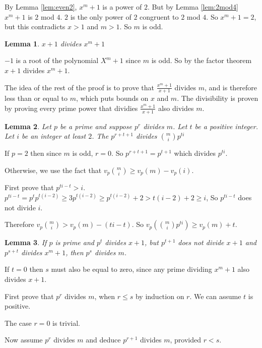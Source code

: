 \documentclass[11pt]{article} %
\newtheorem{lemma}{Lemma}
\begin{document}
By Lemma \ref{lem:even2}, $x^m + 1$ is a power of $2$. But by
Lemma \ref{lem:2mod4} $x^m + 1$ is $2$ mod $4$. $2$ is the only power of $2$ congruent to
$2$ mod $4$. So $x^m + 1 = 2$, but this contradicts $x > 1$ and $m > 1$. So $m$ is odd.

\begin{lemma}\label{lem:poly}
$x + 1$ divides $x^m + 1$
\end{lemma}
$-1$ is a root of the polynomial $X^m + 1$ since $m$ is odd. So by the factor theorem $x+1$ divides
$x^m + 1$.

The idea of the rest of the proof is to prove that $\frac{x^m+1}{x+1}$ divides $m$, and is therefore less
than or equal to $m$, which puts bounds on $x$ and $m$. The divisibility is proven by proving every prime power that
dividies $\frac{x^m+1}{x+1}$ also divides $m$.

\begin{lemma}\label{lem:dvdchoose}
  Let $p$ be a prime and suppose $p^r$ divides $m$. Let $t$ be a positive integer.
  Let $i$ be an integer at least $2$. The $p^{r + t + 1}$ divides ${{m}\choose{i}} p^{ti}$
\end{lemma}

If $p=2$ then since $m$ is odd, $r = 0$. So $p^{r + t +1} = p^{t+1}$ which divides $p^{ti}$.

Otherwise, we use the fact that $v_p{{m}\choose {i}} \ge v_p(m) - v_p(i)$.

First prove that $p^{ti - t} > i$.
$p^{ti - t} = p ^{t} p^{t(i-2)} \ge 3p^{t(i-2)} \ge p^{t(i-2)} + 2 > t(i-2) + 2 \ge i$,
So $p^{ti - t}$ does not divide $i$.

Therefore $v_p{{m}\choose {i}} > v_p(m) - (ti - t) $.
So $v_p\left({{m}\choose {i}}p^{ti}\right) \ge v_p(m) + t$.

\begin{lemma}\label{lem:primepowdvd}
  If $p$ is prime and $p^t$ divides $x+1$, but $p^{t+1}$ does not divide $x+1$ and
  $p^{s+t}$ divides $x^m + 1$, then $p^{s}$ divides $m$.
\end{lemma}

If $t=0$ then $s$ must also be equal to zero, since any prime dividing $x^m+1$ also divides $x+1$.

First prove that $p^r$ divides $m$, when $r \le s$ by induction on $r$.
We can assume $t$ is positive.

The case $r = 0$ is trivial.

Now assume $p^r$ divides $m$ and deduce $p^{r+1}$ divides $m$, provided $r < s$.
\end{document}
